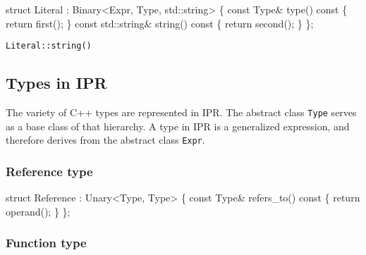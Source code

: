 \documentclass[a4paper,12pt]{article}
\begin{document}
\begin{Program}
   struct Literal : Binary<Expr, Type, std::string> \{
      const Type& type() const \{ return first(); \}
      const std::string& string() const \{ return second(); \}
   \};
\end{Program}

\begin{description}
\item[\texttt{Literal::string()}] 
\end{description}

\subsection{Types in IPR}
\label{sec:interface:types}

The variety of C++ types are represented in IPR.  The abstract class
\texttt{Type} serves as a base class of that hierarchy.  A type in IPR is a
generalized expression, and therefore derives from the abstract class
\texttt{Expr}.

\subsubsection{Reference type}

\begin{Program}
  struct Reference : Unary<Type, Type> \{
    const Type& refers_to() const \{ return operand(); \}
  \};
\end{Program}


\subsubsection{Function type}
\end{document}
